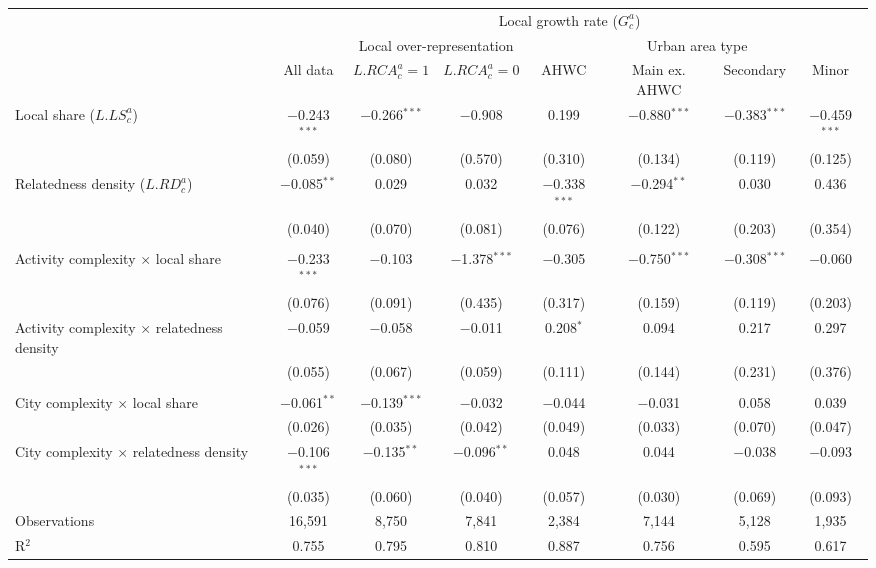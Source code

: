 \begin{tabular}{lccccccc}
\toprule
& \multicolumn{7}{c}{Local growth rate ($G_c^a$)} \\
\cmidrule(lr){2-8}
& & \multicolumn{2}{c}{Local over-representation} & \multicolumn{4}{c}{Urban area type} \\
\cmidrule(lr){3-4} \cmidrule(lr){5-8}
&
All data & $L.RCA_c^a = 1$ & $L.RCA_c^a = 0$ & AHWC & Main ex. AHWC & Secondary & Minor
\\
\midrule
Local share ($L.LS_c^a$) & $-$0.243$^{***}$ & $-$0.266$^{***}$ & $-$0.908 & 0.199 & $-$0.880$^{***}$ & $-$0.383$^{***}$ & $-$0.459$^{***}$ \\
& (0.059) & (0.080) & (0.570) & (0.310) & (0.134) & (0.119) & (0.125) \\
Relatedness density ($L.RD_c^a$) & $-$0.085$^{**}$ & 0.029 & 0.032 & $-$0.338$^{***}$ & $-$0.294$^{**}$ & 0.030 & 0.436 \\
& (0.040) & (0.070) & (0.081) & (0.076) & (0.122) & (0.203) & (0.354) \\
\\
Activity complexity $\times$ local share & $-$0.233$^{***}$ & $-$0.103 & $-$1.378$^{***}$ & $-$0.305 & $-$0.750$^{***}$ & $-$0.308$^{***}$ & $-$0.060 \\
& (0.076) & (0.091) & (0.435) & (0.317) & (0.159) & (0.119) & (0.203) \\
Activity complexity $\times$ relatedness density & $-$0.059 & $-$0.058 & $-$0.011 & 0.208$^{*}$ & 0.094 & 0.217 & 0.297 \\
& (0.055) & (0.067) & (0.059) & (0.111) & (0.144) & (0.231) & (0.376) \\
\\
City complexity $\times$ local share & $-$0.061$^{**}$ & $-$0.139$^{***}$ & $-$0.032 & $-$0.044 & $-$0.031 & 0.058 & 0.039 \\
& (0.026) & (0.035) & (0.042) & (0.049) & (0.033) & (0.070) & (0.047) \\
City complexity $\times$ relatedness density & $-$0.106$^{***}$ & $-$0.135$^{**}$ & $-$0.096$^{**}$ & 0.048 & 0.044 & $-$0.038 & $-$0.093 \\
& (0.035) & (0.060) & (0.040) & (0.057) & (0.030) & (0.069) & (0.093) \\
\midrule
Observations & 16,591 & 8,750 & 7,841 & 2,384 & 7,144 & 5,128 & 1,935 \\
R$^{2}$ & 0.755 & 0.795 & 0.810 & 0.887 & 0.756 & 0.595 & 0.617 \\
\bottomrule
\end{tabular}
